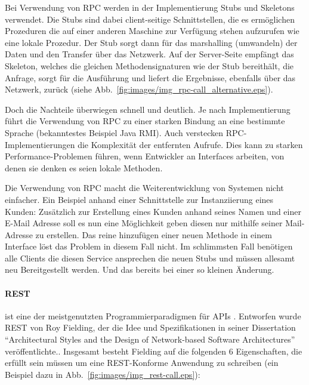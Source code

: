 \documentclass[12pt,a4paper,bibliography=totocnumbered,listof=totocnumbered]{scrartcl}
\begin{document}
Bei Verwendung von RPC werden in der Implementierung Stubs und Skeletons verwendet. Die Stubs sind dabei client-seitige Schnittstellen, die es ermöglichen Prozeduren die auf einer anderen Maschine zur Verfügung stehen aufzurufen wie eine lokale Prozedur. Der Stub sorgt dann für das marshalling (umwandeln) der Daten und den Transfer über das Netzwerk. Auf der Server-Seite empfängt das Skeleton, welches die gleichen Methodensignaturen wie der Stub bereithält, die Anfrage, sorgt für die Ausführung und liefert die Ergebnisse, ebenfalls über das Netzwerk, zurück (siehe Abb.~\ref{fig:images/img_rpc-call_alternative.eps}).\cite{krzyzanowski}


Doch die Nachteile überwiegen schnell und deutlich. Je nach Implementierung führt die Verwendung von RPC zu einer starken Bindung an eine bestimmte Sprache (bekanntestes Beispiel Java RMI). Auch verstecken RPC-Implementierungen die Komplexität der entfernten Aufrufe. Dies kann zu starken Performance-Problemen führen, wenn Entwickler an Interfaces arbeiten, von denen sie denken es seien lokale Methoden\cite[S.93]{buildingms}.

Die Verwendung von RPC macht die Weiterentwicklung von Systemen nicht einfacher. Ein Beispiel anhand einer Schnittstelle zur Instanziierung eines Kunden: Zusätzlich zur Erstellung eines Kunden anhand seines Namen und einer E-Mail Adresse soll es nun eine Möglichkeit geben diesen nur mithilfe seiner Mail-Adresse zu erstellen. Das reine hinzufügen einer neuen Methode in einem Interface löst das Problem in diesem Fall nicht. Im schlimmsten Fall benötigen alle Clients die diesen Service ansprechen die neuen Stubs und müssen allesamt neu Bereitgestellt werden\cite[S.94]{buildingms}. Und das bereits bei einer so kleinen Änderung.

\paragraph{\acf{REST}} ist eine der meistgenutzten Programmierparadigmen für \acp{API} \cite{duvander}. Entworfen wurde \ac{REST} von Roy Fielding, der die Idee und Spezifikationen in seiner Dissertation \enquote{Architectural Styles and the Design of Network-based Software Architectures} veröffentlichte.\cite{fielding}. Insgesamt besteht Fielding auf die folgenden 6 Eigenschaften, die erfüllt sein müssen um eine REST-Konforme Anwendung zu schreiben (ein Beispiel dazu in Abb.~\ref{fig:images/img_rest-call.eps}):
\end{document}
